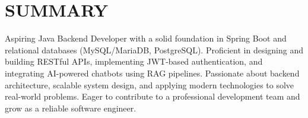 \section{SUMMARY}
\small
\noindent Aspiring Java Backend Developer with a solid foundation in Spring Boot and relational databases (MySQL/MariaDB, PostgreSQL). Proficient in designing and building RESTful APIs, implementing JWT-based authentication, and integrating AI-powered chatbots using RAG pipelines. Passionate about backend architecture, scalable system design, and applying modern technologies to solve real-world problems. Eager to contribute to a professional development team and grow as a reliable software engineer.
\normalsize
